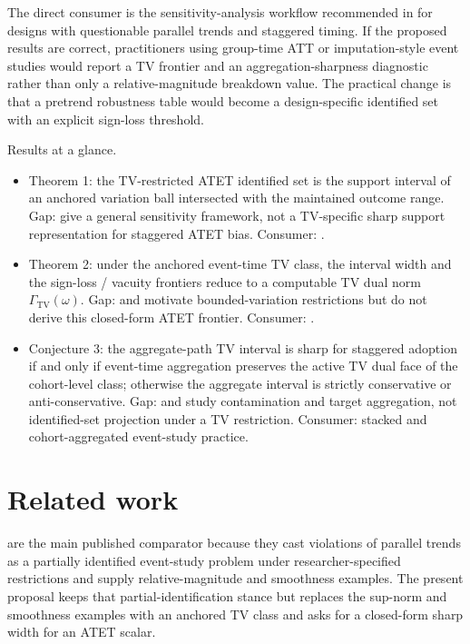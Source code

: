 \documentclass[11pt]{article}
\theoremstyle{definition}
\theoremstyle{plain}
\theoremstyle{remark}
\begin{document}
The direct consumer is the sensitivity-analysis workflow recommended in \citet{RothSantAnnaBilinskiPoe2023TrendingDiD} for designs with questionable parallel trends and staggered timing. If the proposed results are correct, practitioners using group-time ATT or imputation-style event studies \citep{CallawaySantAnna2021MultiplePeriods,BorusyakJaravelSpiess2024EventStudies} would report a TV frontier and an aggregation-sharpness diagnostic rather than only a relative-magnitude breakdown value. The practical change is that a pretrend robustness table would become a design-specific identified set with an explicit sign-loss threshold.

Results at a glance.
\begin{itemize}[leftmargin=*]
\item Theorem 1: the TV-restricted ATET identified set is the support interval of an anchored variation ball intersected with the maintained outcome range. Gap: \citet{RambachanRoth2023CrediblePT} give a general sensitivity framework, not a TV-specific sharp support representation for staggered ATET bias. Consumer: \citet{RothSantAnnaBilinskiPoe2023TrendingDiD}.
\item Theorem 2: under the anchored event-time TV class, the interval width and the sign-loss / vacuity frontiers reduce to a computable TV dual norm \(\Gamma_{\mathrm{TV}}(\omega)\). Gap: \citet{RambachanRoth2023CrediblePT} and \citet{ManskiPepper2018BoundedVariation} motivate bounded-variation restrictions but do not derive this closed-form ATET frontier. Consumer: \citet{CallawaySantAnna2021MultiplePeriods}.
\item Conjecture 3: the aggregate-path TV interval is sharp for staggered adoption if and only if event-time aggregation preserves the active TV dual face of the cohort-level class; otherwise the aggregate interval is strictly conservative or anti-conservative. Gap: \citet{SunAbraham2021DynamicEffects} and \citet{BorusyakJaravelSpiess2024EventStudies} study contamination and target aggregation, not identified-set projection under a TV restriction. Consumer: stacked and cohort-aggregated event-study practice.
\end{itemize}

\section{Related work}
\citet{RambachanRoth2023CrediblePT} are the main published comparator because they cast violations of parallel trends as a partially identified event-study problem under researcher-specified restrictions and supply relative-magnitude and smoothness examples. The present proposal keeps that partial-identification stance but replaces the sup-norm and smoothness examples with an anchored TV class and asks for a closed-form sharp width for an ATET scalar.
\end{document}
